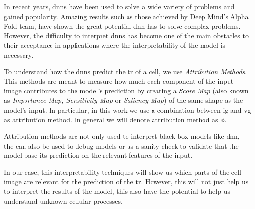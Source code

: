 \glsresetall
In recent years, \glspl{dnn} have been used to solve a wide variety of problems and gained popularity. Amazing results such as those achieved by Deep Mind's Alpha Fold team, have shown the great potential \gls{dnn} has to solve complex problems. However, the difficulty to interpret \glspl{dnn} has become one of the main obstacles to their acceptance in applications where the interpretability of the model is necessary.

To understand how the \glspl{dnn} predict the \gls{tr} of a cell, we use \textit{Attribution Methods}. This methods are meant to measure how much each component of the input image contributes to the model's prediction by creating a \textit{Score Map} (also known as \textit{Importance Map, Sensitivity Map} or \textit{Saliency Map}) of the same shape as the model's input. In particular, in this work we use a combination between \gls{ig} \cite{sundararajan2017axiomatic} and \gls{vg} \cite{adebayo2020sanity} as attribution method. In general we will denote attribution method as $\phi$.

Attribution methods are not only used to interpret black-box models like \gls{dnn}, the can also be used to debug models or as a sanity check to validate that the model base its prediction on the relevant features of the input.

In our case, this interpretability techniques will show us which parts of the cell image are relevant for the prediction of the \gls{tr}. However, this will not just help us to interpret the results of the model, this also have the potential to help us understand unknown cellular processes.
